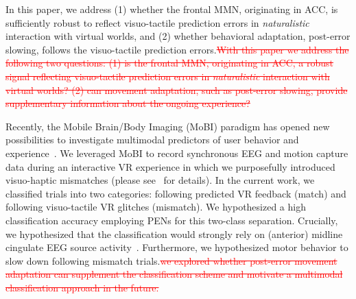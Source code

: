 \textcolor{n}{In this paper, we address (1) whether the frontal MMN, originating in ACC, is sufficiently robust to reflect visuo-tactile prediction errors in \textit{naturalistic} interaction with virtual worlds, and (2) whether behavioral adaptation, post-error slowing, follows the visuo-tactile prediction errors.}\textcolor{red}{\st{With this paper we address the following two questions: (1) is the frontal MMN, originating in ACC, a robust signal reflecting visuo-tactile prediction errors in \textit{naturalistic} interaction with virtual worlds? (2) can movement adaptation, such as post-error slowing, provide supplementary information about the ongoing experience?}}

Recently, the Mobile Brain/Body Imaging (MoBI) paradigm has opened new possibilities to investigate multimodal predictors of user behavior and experience~\cite{Makeig2009-je, Gramann2011-fr, Gramann2014-qo, Jungnickel2019-mv}. We leveraged MoBI to record synchronous EEG and motion capture data during an interactive VR experience in which we purposefully introduced visuo-haptic mismatches (please see~\cite{Gehrke2019-og} for details). In the current work, we classified trials into two categories: following predicted VR feedback (match) and following visuo-tactile VR glitches (mismatch). We hypothesized a high classification accuracy employing PENs for this two-class separation. Crucially, we hypothesized that the classification would strongly rely on (anterior) midline cingulate EEG source activity~\cite{Zander2016-ed, Tollner2017-rm}. Furthermore, \textcolor{n}{we hypothesized motor behavior to slow down following mismatch trials.}\textcolor{red}{\st{we explored whether post-error movement adaptation can supplement the classification scheme and motivate a multimodal classification approach in the future.}}











